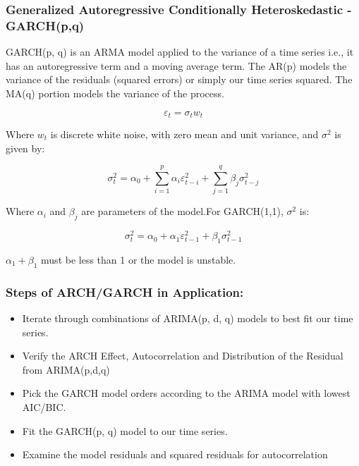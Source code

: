         \subsubsection {Generalized Autoregressive Conditionally Heteroskedastic - GARCH(p,q)}
GARCH(p, q)  is an ARMA model applied to the variance of a time series i.e., it has an autoregressive term and a moving average term. The AR(p) models the variance of the residuals (squared errors) or simply our time series squared. The MA(q) portion models the variance of the process.

$$\varepsilon_t = \sigma_t w_t$$

Where $w_t$ is discrete white noise, with zero mean and unit variance, and $\sigma^2$ is given by:

$$\sigma_t^2=\alpha_0+\sum_{i=1}^{p}\alpha_i\varepsilon_{t-i}^2+\sum_{j=1}^{q}\beta_j\sigma_{t-j}^2$$

Where $\alpha_i$ and $\beta_j$ are parameters of the model.For GARCH(1,1), $\sigma^2$ is:

$$\sigma_t^2=\alpha_0+\alpha_1\varepsilon_{t-1}^2+\beta_1\sigma_{t-1}^2$$

$\alpha_1 + \beta_1$ must be less than 1 or the model is unstable.
\\
		\subsubsection {Steps of ARCH/GARCH in Application:}
        \begin{itemize}
          \item  Iterate through combinations of ARIMA(p, d, q) models to best fit our time series.
          \item  Verify the ARCH Effect, Autocorrelation and Distribution of the Residual from ARIMA(p,d,q)
          \item  Pick the GARCH model orders according to the ARIMA model with lowest AIC/BIC.
          \item  Fit the GARCH(p, q) model to our time series.
          \item  Examine the model residuals and squared residuals for autocorrelation
        \end{itemize}
